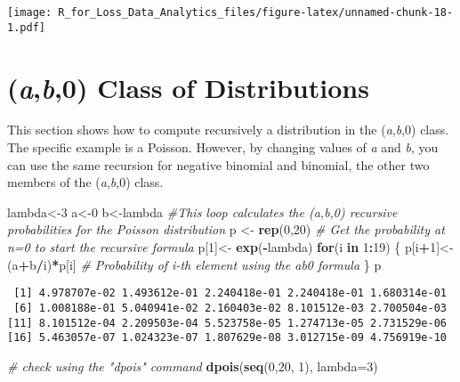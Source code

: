 \documentclass[]{book}
\newenvironment{Shaded}{\begin{snugshade}}{\end{snugshade}}
\newcommand{\KeywordTok}[1]{\textcolor[rgb]{0.13,0.29,0.53}{\textbf{#1}}}
\newcommand{\DataTypeTok}[1]{\textcolor[rgb]{0.13,0.29,0.53}{#1}}
\newcommand{\DecValTok}[1]{\textcolor[rgb]{0.00,0.00,0.81}{#1}}
\newcommand{\StringTok}[1]{\textcolor[rgb]{0.31,0.60,0.02}{#1}}
\newcommand{\CommentTok}[1]{\textcolor[rgb]{0.56,0.35,0.01}{\textit{#1}}}
\newcommand{\ControlFlowTok}[1]{\textcolor[rgb]{0.13,0.29,0.53}{\textbf{#1}}}
\newcommand{\OperatorTok}[1]{\textcolor[rgb]{0.81,0.36,0.00}{\textbf{#1}}}
\newcommand{\NormalTok}[1]{#1}
\theoremstyle{definition}
\theoremstyle{definition}
\theoremstyle{definition}
\theoremstyle{remark}
\begin{document}
\texttt{[image: R\_for\_Loss\_Data\_Analytics\_files/figure-latex/unnamed-chunk-18-1.pdf]}

\section{\texorpdfstring{(\emph{a},\emph{b},0) Class of
Distributions}{(a,b,0) Class of Distributions}}\label{ab0-class-of-distributions}

This section shows how to compute recursively a distribution in the
(\emph{a},\emph{b},0) class. The specific example is a Poisson. However,
by changing values of \emph{a} and \emph{b}, you can use the same
recursion for negative binomial and binomial, the other two members of
the (\emph{a},\emph{b},0) class.

\begin{Shaded}
\begin{Highlighting}[]
\NormalTok{lambda<-}\DecValTok{3}
\NormalTok{a<-}\DecValTok{0}
\NormalTok{b<-lambda}
\CommentTok{#This loop calculates the (a,b,0) recursive probabilities for the Poisson distribution}
\NormalTok{p <-}\StringTok{ }\KeywordTok{rep}\NormalTok{(}\DecValTok{0}\NormalTok{,}\DecValTok{20}\NormalTok{)}
\CommentTok{# Get the probability at n=0 to start the recursive formula }
\NormalTok{p[}\DecValTok{1}\NormalTok{]<-}\StringTok{ }\KeywordTok{exp}\NormalTok{(}\OperatorTok{-}\NormalTok{lambda)}
\ControlFlowTok{for}\NormalTok{(i }\ControlFlowTok{in} \DecValTok{1}\OperatorTok{:}\DecValTok{19}\NormalTok{)}
\NormalTok{  \{}
\NormalTok{  p[i}\OperatorTok{+}\DecValTok{1}\NormalTok{]<-(a}\OperatorTok{+}\NormalTok{b}\OperatorTok{/}\NormalTok{i)}\OperatorTok{*}\NormalTok{p[i]         }\CommentTok{# Probability of i-th element using the ab0 formula}
\NormalTok{  \}}
\NormalTok{p}
\end{Highlighting}
\end{Shaded}

\begin{verbatim}
 [1] 4.978707e-02 1.493612e-01 2.240418e-01 2.240418e-01 1.680314e-01
 [6] 1.008188e-01 5.040941e-02 2.160403e-02 8.101512e-03 2.700504e-03
[11] 8.101512e-04 2.209503e-04 5.523758e-05 1.274713e-05 2.731529e-06
[16] 5.463057e-07 1.024323e-07 1.807629e-08 3.012715e-09 4.756919e-10
\end{verbatim}

\begin{Shaded}
\begin{Highlighting}[]
\CommentTok{# check using the "dpois" command}
\KeywordTok{dpois}\NormalTok{(}\KeywordTok{seq}\NormalTok{(}\DecValTok{0}\NormalTok{,}\DecValTok{20}\NormalTok{, }\DecValTok{1}\NormalTok{), }\DataTypeTok{lambda=}\DecValTok{3}\NormalTok{)}
\end{Highlighting}
\end{Shaded}
\end{document}
